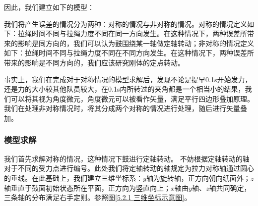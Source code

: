 \documentclass[nocover]{cumcmart}%
\begin{document}
因此，我们建立如下的模型：

我们将产生误差的情况分为两种：对称的情况与非对称的情况。对称的情况定义如下：拉绳时间不同与拉绳力度不同在同一方向发生。在这种情况下，两种误差所带来的影响是同方向的，我们可以认为鼓围绕某一轴做定轴转动；非对称的情况定义如下：拉绳时间不同与拉绳力度不同在不同方向发生。在这种情况下，两种误差所带来的影响是不同方向的，我们应该研究刚体的定点转动。

事实上，我们在完成对于对称情况的模型求解后，发现不论是提早0.1s开始发力，还是力的大小较其他队员较大，在0.1s内所转过的夹角都是一个相当小的结果，我们可以将其视为角度微元\cite{力学}，角度微元可以被看作矢量\cite{力学}，满足平行四边形叠加原理。我们在处理非对称情况时，将其分成两个对称的情况进行处理，随后进行矢量叠加。

\subsubsection{模型求解}
我们首先求解对称的情况，这种情况下鼓进行定轴转动。
不妨根据定轴转动的轴对于不同的受力点进行编号。此处我们将定轴转动的轴规定为拉力对称轴通过圆心的垂线。在此基础上，我们建立三维坐标系：$y$轴为旋转轴，正方向朝向纸面外；$z$轴垂直于鼓面初始状态所在平面，正方向为竖直向上；$x$轴由$y$轴、$z$轴共同确定，三条轴的分布满足右手定则。参照图\ref{5.2.1 三维坐标示意图}。
\end{document}
